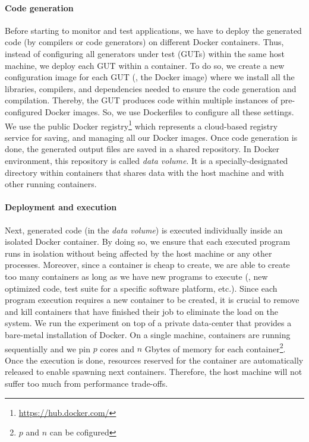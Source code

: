 \paragraph{Code generation}
Before starting to monitor and test applications, we have to deploy the generated code (by compilers or code generators) on different Docker containers. 
Thus, instead of configuring all generators under test (GUTs) within the same host machine, we deploy each GUT within a container. To do so, we create a new configuration image for each GUT (\ie, the Docker image) where we install all the libraries, compilers, and dependencies needed to ensure the code generation and compilation. Thereby, the GUT produces code within multiple instances of pre-configured Docker images. So, we use Dockerfiles to configure all these settings.
We use the public Docker registry\footnote{\url{https://hub.docker.com/}} which represents a cloud-based registry service for saving, and managing all our Docker images. 
Once code generation is done, the generated output files are saved in a shared repository. In Docker environment, this repository is called \textit{data volume}. It is a specially-designated directory within containers that shares data with the host machine and with other running containers.
 
\paragraph{Deployment and execution}
Next, generated code (in the \textit{data volume}) is executed individually inside an isolated Docker container. By doing so, we ensure that each executed program runs in isolation without being affected by the host machine or any other processes. Moreover, since a container is cheap to create, we are able to create too many containers as long as we have new programs to execute (\eg, new optimized code, test suite for a specific software platform, etc.).
Since each program execution requires a new container to be created, it is crucial to remove and kill containers that have finished their job to eliminate the load on the system. We run the experiment on top of a private data-center that provides a bare-metal installation of Docker. On a single machine, containers are running sequentially and we pin $p$ cores and $n$ Gbytes of memory for each container\footnote{$p$ and $n$ can be cofigured}. Once the execution is done, resources reserved for the container are automatically released to enable spawning next containers. Therefore, the host machine will not suffer too much from performance trade-offs.

